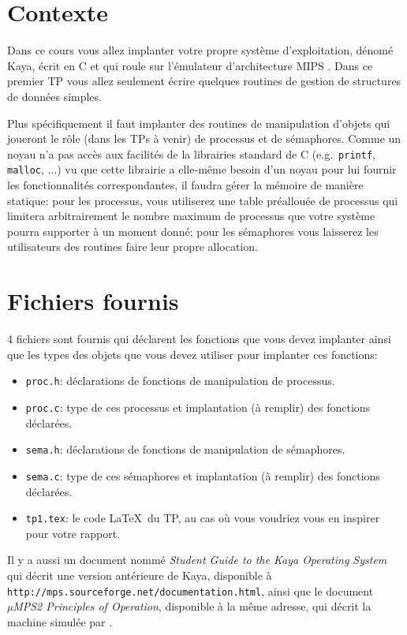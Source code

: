 \documentclass{article}
\begin{document}
\section{Contexte}

Dans ce cours vous allez implanter votre propre système d'exploitation,
dénomé Kaya, écrit en C et qui roule sur l'émulateur d'architecture MIPS
\uMPS.  Dans ce premier TP vous allez seulement écrire quelques routines
de gestion de structures de données simples.

Plus spécifiquement il faut implanter des routines de manipulation d'objets
qui joueront le rôle (dans les TPs à venir) de processus et de sémaphores.
Comme un noyau n'a pas accès aux facilités de la librairies standard de
C (e.g.~\texttt{printf}, \texttt{malloc}, ...) vu que cette librairie
a elle-même besoin d'un noyau pour lui fournir les fonctionnalités
correspondantes, il faudra gérer la mémoire de manière statique: pour les
processus, vous utiliserez une table préallouée de processus qui limitera
arbitrairement le nombre maximum de processus que votre système pourra
supporter à un moment donné; pour les sémaphores vous laisserez les
utilisateurs des routines faire leur propre allocation.

\section{Fichiers fournis}

4 fichiers sont fournis qui déclarent les fonctions que vous devez implanter
ainsi que les types des objets que vous devez utiliser pour implanter
ces fonctions:
\begin{itemize}
\item \texttt{proc.h}: déclarations de fonctions de manipulation
  de processus.
\item \texttt{proc.c}: type de ces processus et implantation (à remplir)
  des fonctions déclarées.
\item \texttt{sema.h}: déclarations de fonctions de manipulation
  de sémaphores.
\item \texttt{sema.c}: type de ces sémaphores et implantation (à remplir)
  des fonctions déclarées.
\item \texttt{tp1.tex}: le code \LaTeX\ du TP, au cas où vous voudriez vous
  en inspirer pour votre rapport.
\end{itemize}

Il y a aussi un document nommé \emph{Student Guide to the Kaya Operating
  System} qui décrit une version antérieure de Kaya, disponible
à \texttt{http://mps.sourceforge.net/documentation.html}, ainsi que le
document \emph{µMPS2 Principles of Operation}, disponible à la même adresse,
qui décrit la machine simulée par \uMPS.
\end{document}
